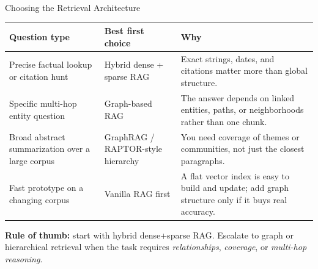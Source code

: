 \begin{frame}{Choosing the Retrieval Architecture}
\begin{center}
\renewcommand{\arraystretch}{1.25}
\small
\begin{tabular}{|p{3.2cm}|p{3.1cm}|p{5.8cm}|}
\hline
\textbf{Question type} & \textbf{Best first choice} & \textbf{Why} \\
\hline
Precise factual lookup or citation hunt & Hybrid dense + sparse RAG & Exact strings, dates, and citations matter more than global structure. \\
\hline
Specific multi-hop entity question & Graph-based RAG & The answer depends on linked entities, paths, or neighborhoods rather than one chunk. \\
\hline
Broad abstract summarization over a large corpus & GraphRAG / RAPTOR-style hierarchy & You need coverage of themes or communities, not just the closest paragraphs. \\
\hline
Fast prototype on a changing corpus & Vanilla RAG first & A flat vector index is easy to build and update; add graph structure only if it buys real accuracy. \\
\hline
\end{tabular}
\end{center}

\bigskip
\textbf{Rule of thumb:} start with hybrid dense+sparse RAG. Escalate to graph or hierarchical retrieval when the task requires \emph{relationships}, \emph{coverage}, or \emph{multi-hop reasoning}.
\end{frame}

